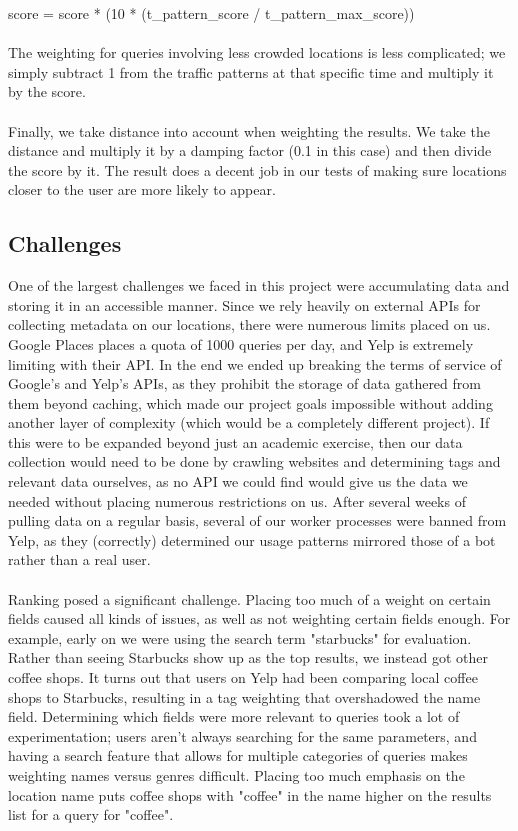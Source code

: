 \documentclass{article}
\begin{document}
score = score * (10 * (t_pattern_score / t_pattern_max_score))
\\ \\
The weighting for queries involving less crowded locations is less complicated; we simply subtract 1 from the traffic patterns at that specific time and multiply it by the score.
\\ \\
Finally, we take distance into account when weighting the results. We take the distance and multiply it by a damping factor (0.1 in this case) and then divide the score by it. The result does a decent job in our tests of making sure locations closer to the user are more likely to appear.

\subsection{Challenges}
One of the largest challenges we faced in this project were accumulating data and storing it in an accessible manner. Since we rely heavily on external APIs for collecting metadata on our locations, there were numerous limits placed on us. Google Places places a quota of 1000 queries per day, and Yelp is extremely limiting with their API. In the end we ended up breaking the terms of service of Google's and Yelp's APIs, as they prohibit the storage of data gathered from them beyond caching, which made our project goals impossible without adding another layer of complexity (which would be a completely different project). If this were to be expanded beyond just an academic exercise, then our data collection would need to be done by crawling websites and determining tags and relevant data ourselves, as no API we could find would give us the data we needed without placing numerous restrictions on us. After several weeks of pulling data on a regular basis, several of our worker processes were banned from Yelp, as they (correctly) determined our usage patterns mirrored those of a bot rather than a real user.
\\ \\
Ranking posed a significant challenge. Placing too much of a weight on certain fields caused all kinds of issues, as well as not weighting certain fields enough. For example, early on we were using the search term "starbucks" for evaluation. Rather than seeing Starbucks show up as the top results, we instead got other coffee shops. It turns out that users on Yelp had been comparing local coffee shops to Starbucks, resulting in a tag weighting that overshadowed the name field. Determining which fields were more relevant to queries took a lot of experimentation; users aren't always searching for the same parameters, and having a search feature that allows for multiple categories of queries makes weighting names versus genres difficult. Placing too much emphasis on the location name puts coffee shops with "coffee" in the name higher on the results list for a query for "coffee".
\end{document}
